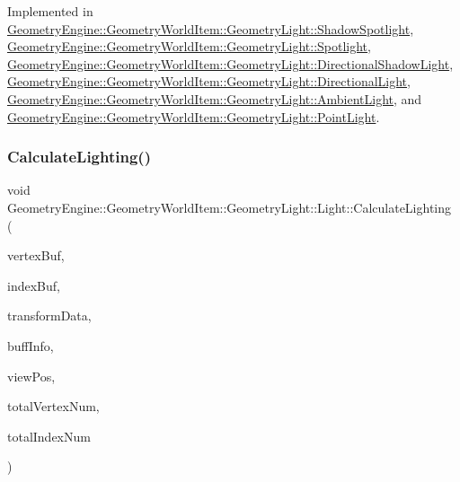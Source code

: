 Implemented in \mbox{\hyperlink{class_geometry_engine_1_1_geometry_world_item_1_1_geometry_light_1_1_shadow_spotlight_a27163f2f8903220d7eaae7aa70c9d6e6}{Geometry\+Engine\+::\+Geometry\+World\+Item\+::\+Geometry\+Light\+::\+Shadow\+Spotlight}}, \mbox{\hyperlink{class_geometry_engine_1_1_geometry_world_item_1_1_geometry_light_1_1_spotlight_a6136ca2338a7b5f5be70ccab82fe655e}{Geometry\+Engine\+::\+Geometry\+World\+Item\+::\+Geometry\+Light\+::\+Spotlight}}, \mbox{\hyperlink{class_geometry_engine_1_1_geometry_world_item_1_1_geometry_light_1_1_directional_shadow_light_a712d0b0a0573ebd246a4a8aa6b2b667a}{Geometry\+Engine\+::\+Geometry\+World\+Item\+::\+Geometry\+Light\+::\+Directional\+Shadow\+Light}}, \mbox{\hyperlink{class_geometry_engine_1_1_geometry_world_item_1_1_geometry_light_1_1_directional_light_af1eac6f1aac9388efe95e1a898cf600f}{Geometry\+Engine\+::\+Geometry\+World\+Item\+::\+Geometry\+Light\+::\+Directional\+Light}}, \mbox{\hyperlink{class_geometry_engine_1_1_geometry_world_item_1_1_geometry_light_1_1_ambient_light_a4f1d4fb9ad25626e15c28de03b610b4f}{Geometry\+Engine\+::\+Geometry\+World\+Item\+::\+Geometry\+Light\+::\+Ambient\+Light}}, and \mbox{\hyperlink{class_geometry_engine_1_1_geometry_world_item_1_1_geometry_light_1_1_point_light_aa30244fd20e61fdfe1ac1d85c99fd154}{Geometry\+Engine\+::\+Geometry\+World\+Item\+::\+Geometry\+Light\+::\+Point\+Light}}.

\mbox{\label{class_geometry_engine_1_1_geometry_world_item_1_1_geometry_light_1_1_light_abffc2b2ce5240b3c21b51020488dba10}} 
\subsubsection{\texorpdfstring{CalculateLighting()}{CalculateLighting()}}
{\footnotesize\ttfamily void Geometry\+Engine\+::\+Geometry\+World\+Item\+::\+Geometry\+Light\+::\+Light\+::\+Calculate\+Lighting (\begin{DoxyParamCaption}\item[{Q\+Open\+G\+L\+Buffer $\ast$}]{vertex\+Buf,  }\item[{Q\+Open\+G\+L\+Buffer $\ast$}]{index\+Buf,  }\item[{const \mbox{\hyperlink{class_geometry_engine_1_1_lighting_transformation_data}{Lighting\+Transformation\+Data}} \&}]{transform\+Data,  }\item[{const \mbox{\hyperlink{class_geometry_engine_1_1_buffers_info}{Buffers\+Info}} \&}]{buff\+Info,  }\item[{const Q\+Vector3D \&}]{view\+Pos,  }\item[{unsigned int}]{total\+Vertex\+Num,  }\item[{unsigned int}]{total\+Index\+Num }\end{DoxyParamCaption})\hspace{0.3cm}{\ttfamily [virtual]}}

